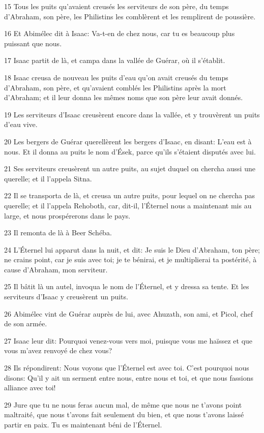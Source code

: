 \par 15 Tous les puits qu'avaient creusés les serviteurs de son père, du temps d'Abraham, son père, les Philistins les comblèrent et les remplirent de poussière.
\par 16 Et Abimélec dit à Isaac: Va-t-en de chez nous, car tu es beaucoup plus puissant que nous.
\par 17 Isaac partit de là, et campa dans la vallée de Guérar, où il s'établit.
\par 18 Isaac creusa de nouveau les puits d'eau qu'on avait creusés du temps d'Abraham, son père, et qu'avaient comblés les Philistins après la mort d'Abraham; et il leur donna les mêmes noms que son père leur avait donnés.
\par 19 Les serviteurs d'Isaac creusèrent encore dans la vallée, et y trouvèrent un puits d'eau vive.
\par 20 Les bergers de Guérar querellèrent les bergers d'Isaac, en disant: L'eau est à nous. Et il donna au puits le nom d'Ések, parce qu'ils s'étaient disputés avec lui.
\par 21 Ses serviteurs creusèrent un autre puits, au sujet duquel on chercha aussi une querelle; et il l'appela Sitna.
\par 22 Il se transporta de là, et creusa un autre puits, pour lequel on ne chercha pas querelle; et il l'appela Rehoboth, car, dit-il, l'Éternel nous a maintenant mis au large, et nous prospérerons dans le pays.
\par 23 Il remonta de là à Beer Schéba.
\par 24 L'Éternel lui apparut dans la nuit, et dit: Je suis le Dieu d'Abraham, ton père; ne crains point, car je suis avec toi; je te bénirai, et je multiplierai ta postérité, à cause d'Abraham, mon serviteur.
\par 25 Il bâtit là un autel, invoqua le nom de l'Éternel, et y dressa sa tente. Et les serviteurs d'Isaac y creusèrent un puits.
\par 26 Abimélec vint de Guérar auprès de lui, avec Ahuzath, son ami, et Picol, chef de son armée.
\par 27 Isaac leur dit: Pourquoi venez-vous vers moi, puisque vous me haïssez et que vous m'avez renvoyé de chez vous?
\par 28 Ils répondirent: Nous voyons que l'Éternel est avec toi. C'est pourquoi nous disons: Qu'il y ait un serment entre nous, entre nous et toi, et que nous fassions alliance avec toi!
\par 29 Jure que tu ne nous feras aucun mal, de même que nous ne t'avons point maltraité, que nous t'avons fait seulement du bien, et que nous t'avons laissé partir en paix. Tu es maintenant béni de l'Éternel.
